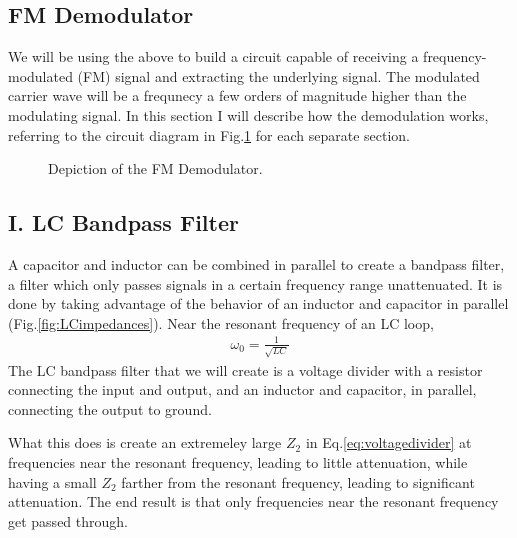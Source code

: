 \documentclass[12pt]{article}
\begin{document}
\subsection*{FM Demodulator}
We will be using the above to build a circuit capable of receiving a frequency-modulated (FM) signal and extracting the underlying signal. The modulated carrier wave will be a frequnecy a few orders of magnitude higher than the modulating signal. In this section I will describe how the demodulation works, referring to the circuit diagram in Fig.\ref{fig:fmdemoddiagram} for each separate section.
\begin{figure}[H]
\caption{Depiction of the FM Demodulator.}
\label{fig:fmdemoddiagram}
\end{figure}

\subsection*{I. LC Bandpass Filter}
A capacitor and inductor can be combined in parallel to create a bandpass filter, a filter which only passes signals in a certain frequency range unattenuated. It is done by taking advantage of the behavior of an inductor and capacitor in parallel (Fig.\ref{fig:LCimpedances}). Near the resonant frequency of an LC loop,
\begin{eqnarray}
\omega_0 = \frac{1}{\sqrt{LC}} \label{eq:resonantfrequency}
\end{eqnarray}
The LC bandpass filter that we will create is a voltage divider with a resistor connecting the input and output, and an inductor and capacitor, in parallel, connecting the output to ground.

What this does is create an extremeley large $Z_2$ in Eq.\ref{eq:voltagedivider} at frequencies near the resonant frequency, leading to little attenuation, while having a small $Z_2$ farther from the resonant frequency, leading to significant attenuation. The end result is that only frequencies near the resonant frequency get passed through.
\end{document}
